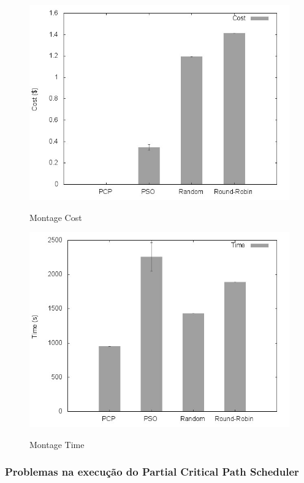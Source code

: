 \documentclass[a4paper,10pt]{article}
\begin{document}
\begin{figure}[!htb]

\centering

\includegraphics[scale=.55]{graphs/papermontage_cost.jpeg}
\label{montage_cost}
\caption{Montage Cost}

\includegraphics[scale=.55]{graphs/papermontage_time.jpeg}
\label{montage_time}
\caption{Montage Time}

\end{figure}
\subsubsection{Problemas na execução do Partial Critical Path Scheduler}
\end{document}
